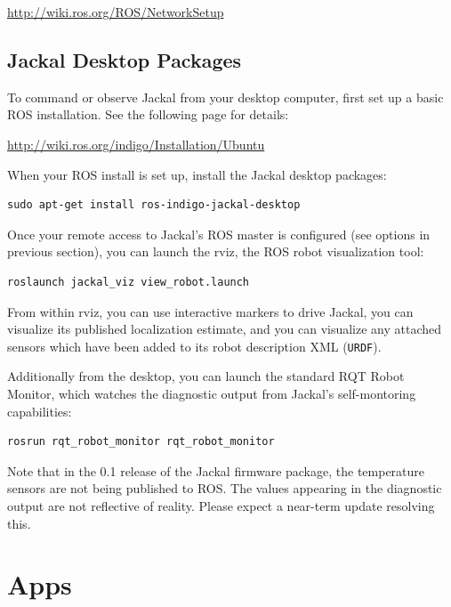 \documentclass[]{clearpath-manual}
\begin{document}
\url{http://wiki.ros.org/ROS/NetworkSetup}

\subsection{Jackal Desktop Packages}

To command or observe Jackal from your desktop computer, first set up a basic
ROS installation. See the following page for details:

\url{http://wiki.ros.org/indigo/Installation/Ubuntu}

When your ROS install is set up, install the Jackal desktop packages:

\begin{lstlisting}
sudo apt-get install ros-indigo-jackal-desktop
\end{lstlisting}

Once your remote access to Jackal's ROS master is configured (see options in previous
section), you can launch the rviz, the ROS robot visualization tool:

\begin{lstlisting}
roslaunch jackal_viz view_robot.launch
\end{lstlisting}

From within rviz, you can use interactive markers to drive Jackal, you can visualize its
published localization estimate, and you can visualize any attached sensors which have been
added to its robot description XML (\lstinline{URDF}).

Additionally from the desktop, you can launch the standard RQT Robot Monitor, which
watches the diagnostic output from Jackal's self-montoring capabilities:

\begin{lstlisting}
rosrun rqt_robot_monitor rqt_robot_monitor
\end{lstlisting}


\begin{warning}
Note that in the 0.1 release of the Jackal firmware package, the temperature sensors are not
being published to ROS. The values appearing in the diagnostic output are not reflective of
reality. Please expect a near-term update resolving this.
\end{warning}

\section{Apps}
\end{document}
